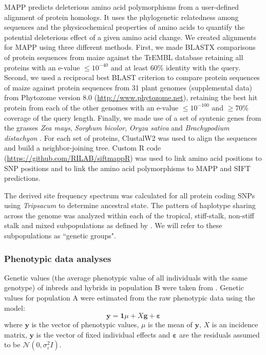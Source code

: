 \documentclass[12pt]{article}
\begin{document}
MAPP predicts deleterious amino acid polymorphisms from a user-defined alignment of protein homologs. It uses the phylogenetic relatedness among sequences and the physicochemical properties of amino acids to quantify the potential deleterious effect of a given amino acid change.  We created alignments for MAPP using three different methods.  First, we made BLASTX comparisons of protein sequences from maize against the TrEMBL database \citep{Boeckmann2003} retaining all proteins with an e-value $\leq 10^{-40}$ and at least 60\% identity with the query.  Second, we used a reciprocal best BLAST criterion to compare protein sequences of maize against protein sequences from 31 plant genomes (supplemental data)  from Phytozome version 8.0 (\url{http://www.phytozome.net}), retaining the best hit protein from each of the other genomes with an e-value $\leq 10^{-100}$ and  $\geq 70\%$ coverage of the query length. Finally, we made use of a set of syntenic genes from the grasses \emph{Zea mays}, \emph{Sorghum bicolor}, \emph{Oryza sativa} and \emph{Brachypodium distachyon}  \citep{Schnable2012}. For each set of proteins, ClustalW2 \citep{Larkin2007} was used to align the sequences and build a neighbor-joining tree. Custom R code (\url{https://github.com/RILAB/siftmappR}) was used to link amino acid positions to SNP positions and to link the amino acid polymorphisms to MAPP and SIFT predictions.

The derived site frequency spectrum was calculated for all protein coding SNPs using \emph{Tripsacum} \citep{Chia2012} to determine ancestral state. 
The pattern of haplotype sharing across the genome \citep[PHS statistics;][]{Toomajian2006} was analyzed within each of the tropical, stiff-stalk, non-stiff stalk and mixed subpopulations as defined by \citet{Flint-Garcia2005}. We will refer to these subpopulations as ``genetic groups".

\subsubsection*{Phenotypic data analyses}

Genetic values (the average phenotypic value of all individuals with the same genotype) of inbreds and hybrids in population B were taken from \citet{Flint-Garcia2009}. 
Genetic values for population A were estimated from the raw phenotypic data using the model:
%
\[\mathbf{y}=\mathbf{1}\mu +X\mathbf{g}+\mathbf{\varepsilon} \]
%
where $\mathbf{y}$ is the vector of phenotypic values, $\mu$ is the mean of $\mathbf{y}$, $X$ is an incidence matrix, $\mathbf{y}$ is the vector of fixed individual effects and $\mathbf{\varepsilon}$ are the residuals assumed to be $\mathcal{N}(0,\sigma _{\varepsilon }^{2}I)$.
\end{document}

